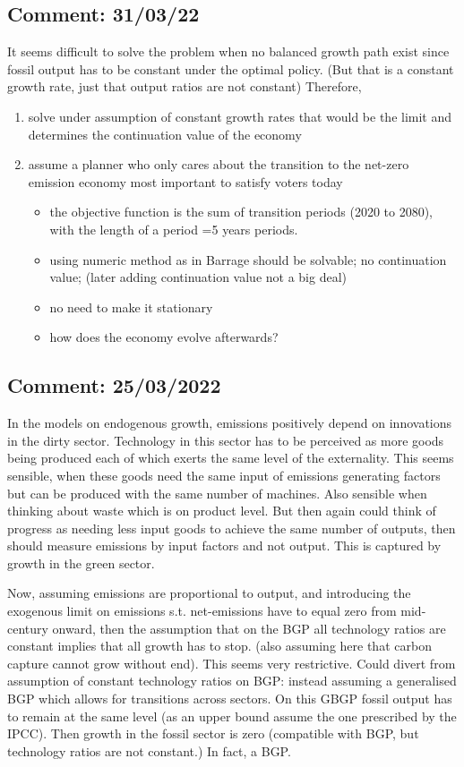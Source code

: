 \subsection*{Comment: 31/03/22}
It seems difficult to solve the problem when no balanced growth path exist since fossil output has to be constant under the optimal policy. (But that is a constant growth rate, just that output ratios are not constant) 
Therefore,
\begin{enumerate}
	\item solve under assumption of constant growth rates \ar that would be the limit and determines the continuation value of the economy
	\item assume a planner who only cares about the transition to the net-zero emission economy \ar most important to satisfy voters today
	\begin{itemize}
		\item the objective function is the sum of transition periods (2020 to 2080), with the length of a period =5 years  periods.
		\item using numeric method as in Barrage should be solvable; no continuation value; (later adding continuation value not a big deal)
		\item no need to make it stationary
		\item how does the economy evolve afterwards?
	\end{itemize}

\end{enumerate}
\subsection*{Comment: 25/03/2022}
In the models on endogenous growth, emissions positively depend on innovations in the dirty sector. Technology in this sector has to be perceived as more goods being produced each of which exerts the same level of the externality. This seems sensible, when these goods need the same input of emissions generating factors but can be produced with the same number of machines. Also sensible when thinking about waste which is on product level. But then again could think of progress as needing less input goods to achieve the same number of outputs, then should measure emissions by input factors and not output. This is captured by growth in the green sector.

Now, assuming emissions are proportional to output, and introducing the exogenous limit on emissions s.t. net-emissions have to equal zero from mid-century onward, then the assumption that on the BGP all technology ratios are constant implies that all growth has to stop. (also assuming here that carbon capture cannot grow without end). This seems very restrictive. Could divert from assumption of constant technology ratios on BGP: instead assuming a generalised BGP which allows for transitions across sectors.  On this GBGP fossil output has to remain at the same level (as an upper bound assume the one prescribed by the IPCC). Then growth in the fossil sector is zero (compatible with BGP, but technology ratios are not constant.) In fact, a BGP. 

